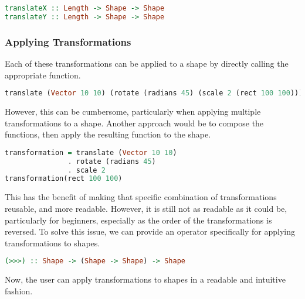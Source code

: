\documentclass[../main.tex]{subfiles}
\begin{document}
                \begin{lstlisting}[language={Haskell}, label={lst:shorthandTransform}, caption={The shorthand 
                    translation functions.}]
translateX :: Length -> Shape -> Shape
translateY :: Length -> Shape -> Shape\end{lstlisting}

            \subsubsection{Applying Transformations}
                Each of these transformations can be applied to a shape by directly calling the
                    appropriate function.

                \begin{lstlisting}[language={Haskell}]
translate (Vector 10 10) (rotate (radians 45) (scale 2 (rect 100 100)))\end{lstlisting}

                However, this can be cumbersome, particularly when applying multiple
                    transformations to a shape.
                Another approach would be to compose the functions, then apply the resulting
                    function to the shape.

                \begin{lstlisting}[language={Haskell}]
transformation = translate (Vector 10 10)
               . rotate (radians 45)
               . scale 2
transformation(rect 100 100)\end{lstlisting}

                This has the benefit of making that specific combination of transformations
                    reusable, and more readable.
                However, it is still not as readable as it could be, particularly for
                    beginners, especially as the order of the transformations is reversed.
                To solve this issue, we can provide an operator specifically for applying
                    transformations to shapes.

                \begin{lstlisting}[language={Haskell}, label={lst:transform}, caption={The transformation application 
                    (\texttt{>>>}) operator.}]
(>>>) :: Shape -> (Shape -> Shape) -> Shape\end{lstlisting}

                Now, the user can apply transformations to shapes in a readable and intuitive
                    fashion.
\end{document}
